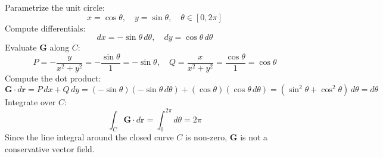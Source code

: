 \documentclass[11pt]{article}
\begin{document}
Parametrize the unit circle:
\[
x = \cos \theta, \quad y = \sin \theta, \quad \theta \in [0, 2\pi]
\]
Compute differentials:
\[
dx = -\sin \theta \, d\theta, \quad dy = \cos \theta \, d\theta
\]
Evaluate $\mathbf{G}$ along $C$:
\[
P = -\frac{y}{x^2 + y^2} = -\frac{\sin \theta}{1} = -\sin \theta, \quad Q = \frac{x}{x^2 + y^2} = \frac{\cos \theta}{1} = \cos \theta
\]
Compute the dot product:
\[
\mathbf{G} \cdot d\mathbf{r} = P \, dx + Q \, dy = (-\sin \theta)(-\sin \theta \, d\theta) + (\cos \theta)(\cos \theta \, d\theta) = (\sin^2 \theta + \cos^2 \theta) \, d\theta = d\theta
\]
Integrate over $C$:
\[
\int_{C} \mathbf{G} \cdot d\mathbf{r} = \int_{0}^{2\pi} d\theta = 2\pi
\]
Since the line integral around the closed curve $C$ is non-zero, $\mathbf{G}$ is not a conservative vector field.
\end{document}
